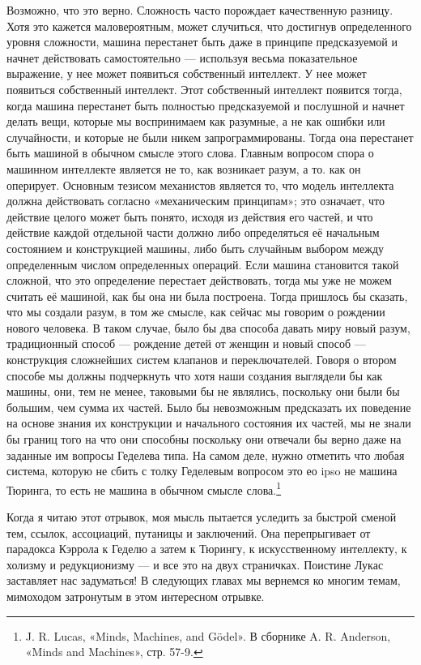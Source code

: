 \documentclass[../main.tex]{subfiles}
\begin{document}
Возможно, что это верно. Сложность часто порождает качественную разницу. Хотя это кажется маловероятным, может случиться, что достигнув определенного уровня сложности, машина перестанет быть даже в принципе предсказуемой и начнет действовать самостоятельно --- используя весьма показательное выражение, у нее может появиться собственный интеллект. У нее может появиться собственный интеллект. Этот собственный интеллект появится тогда, когда машина перестанет быть полностью предсказуемой и послушной и начнет делать вещи, которые мы воспринимаем как разумные, а не как ошибки или случайности, и которые не были никем запрограммированы. Тогда она перестанет быть машиной в обычном смысле этого слова. Главным вопросом спора о машинном интеллекте является не то, как возникает разум, а то. как он оперирует. Основным тезисом механистов является то, что модель интеллекта должна действовать согласно «механическим принципам»; это означает, что действие целого может быть понято, исходя из действия его частей, и что действие каждой отдельной части должно либо определяться её начальным состоянием и конструкцией машины, либо быть случайным выбором между определенным числом определенных операций. Если машина становится такой сложной, что это определение перестает действовать, тогда мы уже не можем считать её машиной, как бы она ни была построена. Тогда пришлось бы сказать, что мы создали разум, в том же смысле, как сейчас мы говорим о рождении нового человека. В таком случае, было бы два способа давать миру новый разум, традиционный способ --- рождение детей от женщин и новый способ --- конструкция сложнейших систем клапанов и переключателей. Говоря о втором способе мы должны подчеркнуть что хотя наши создания выглядели бы как машины, они, тем не менее, таковыми бы не являлись, поскольку они были бы большим, чем сумма их частей. Было бы невозможным предсказать их поведение на основе знания их конструкции и начального состояния их частей, мы не знали бы границ того на что они способны поскольку они отвечали бы верно даже на заданные им вопросы Геделева типа. На самом деле, нужно отметить что любая система, которую не сбить с толку Геделевым вопросом это ео ipso не машина Тюринга, то есть не машина в обычном смысле слова.\footnote{J. R. Lucas, «Minds, Machines, and Gödel». В сборнике A. R. Anderson, «Minds and Machines», стр. 57-9.}

Когда я читаю этот отрывок, моя мысль пытается уследить за быстрой сменой тем, ссылок, ассоциаций, путаницы и заключений. Она перепрыгивает от парадокса Кэррола к Геделю а затем к Тюрингу, к искусственному интеллекту, к холизму и редукционизму --- и все это на двух страничках. Поистине Лукас заставляет нас задуматься! В следующих главах мы вернемся ко многим темам, мимоходом затронутым в этом интересном отрывке.
\end{document}
